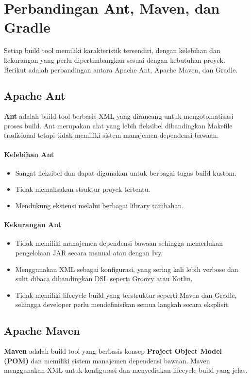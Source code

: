 \section{Perbandingan Ant, Maven, dan Gradle}
Setiap build tool memiliki karakteristik tersendiri, dengan kelebihan dan kekurangan yang perlu dipertimbangkan sesuai dengan kebutuhan proyek. Berikut adalah perbandingan antara Apache Ant, Apache Maven, dan Gradle.

\subsection{Apache Ant}
\textbf{Ant} adalah build tool berbasis XML yang dirancang untuk mengotomatisasi proses build. Ant merupakan alat yang lebih fleksibel dibandingkan Makefile tradisional tetapi tidak memiliki sistem manajemen dependensi bawaan.

\paragraph{Kelebihan Ant}
\begin{itemize}
	\item Sangat fleksibel dan dapat digunakan untuk berbagai tugas build kustom.
	\item Tidak memaksakan struktur proyek tertentu.
	\item Mendukung ekstensi melalui berbagai library tambahan.
\end{itemize}

\paragraph{Kekurangan Ant}
\begin{itemize}
	\item Tidak memiliki manajemen dependensi bawaan sehingga memerlukan pengelolaan JAR secara manual atau dengan Ivy.
	\item Menggunakan XML sebagai konfigurasi, yang sering kali lebih verbose dan sulit dibaca dibandingkan DSL seperti Groovy atau Kotlin.
	\item Tidak memiliki lifecycle build yang terstruktur seperti Maven dan Gradle, sehingga developer perlu mendefinisikan semua langkah secara eksplisit.
\end{itemize}

\subsection{Apache Maven}
\textbf{Maven} adalah build tool yang berbasis konsep \textbf{Project Object Model (POM)} dan memiliki sistem manajemen dependensi bawaan. Maven menggunakan XML untuk konfigurasi dan menyediakan lifecycle build yang jelas.

